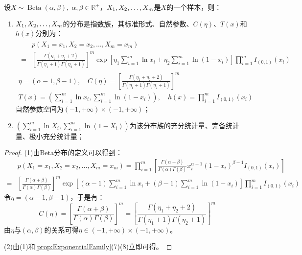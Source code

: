 \begin{theorem}
	设$X\sim\operatorname{Beta}(\alpha,\beta),\;\alpha,\beta\in\mathbb{R}^{+}$，$X_1, X_2, \dots, X_{m}$是$X$的一个样本，则：
	\begin{enumerate}
		\item $X_1, X_2, \dots, X_{m}$的分布是指数族，其标准形式、自然参数、$C(\eta)$、$T(x)$和$h(x)$分别为：
		\begin{gather*}
			\begin{aligned}
				&p(X_1=x_1,X_2=x_2,\dots,X_m=x_m) \\
				=&\left[\frac{\Gamma(\eta_1+\eta_2+2)}{\Gamma(\eta_1+1)\Gamma(\eta_2+1)}\right]^m\exp\left[\eta_1\sum_{i=1}^{m}\ln x_i+\eta_2\sum_{i=1}^{m}\ln(1-x_i)\right]\prod_{i=1}^{m}I_{(0,1)}(x_i)
			\end{aligned} \\
			\eta=(\alpha-1,\beta-1),\quad C(\eta)=\left[\frac{\Gamma(\eta_1+\eta_2+2)}{\Gamma(\eta_1+1)\Gamma(\eta_2+1)}\right]^m \\
			T(x)=\left(\sum_{i=1}^{m}\ln x_i,\sum_{i=1}^{m}\ln(1-x_i)\right),\quad h(x)=\prod_{i=1}^{m}I_{(0,1)}(x_i)
		\end{gather*}
		自然参数空间为$(-1,+\infty)\times(-1,+\infty)$；
		\item $\left(\sum\limits_{i=1}^{m}\ln X_i,\sum\limits_{i=1}^{m}\ln(1-X_i)\right)$为该分布族的充分统计量、完备统计量、极小充分统计量；
	\end{enumerate}
\end{theorem}
\begin{proof}
	(1)由Beta分布的定义可以得到：
	\begin{align*}
		&p(X_1=x_1,X_2=x_2,\dots,X_m=x_m)=\prod_{i=1}^{m}\left[\frac{\Gamma(\alpha+\beta)}{\Gamma(\alpha)\Gamma(\beta)}x_i^{\alpha-1}(1-x_i)^{\beta-1}I_{(0,1)}(x_i)\right] \\
		=&\left[\frac{\Gamma(\alpha+\beta)}{\Gamma(\alpha)\Gamma(\beta)}\right]^m\exp\left[(\alpha-1)\sum_{i=1}^{m}\ln x_i+(\beta-1)\sum_{i=1}^{m}\ln(1-x_i)\right]\prod_{i=1}^{m}I_{(0,1)}(x_i)
	\end{align*}
	令$\eta=(\alpha-1,\beta-1)$，于是有：
	\begin{equation*}
		C(\eta)=\left[\frac{\Gamma(\alpha+\beta)}{\Gamma(\alpha)\Gamma(\beta)}\right]^m=\left[\frac{\Gamma(\eta_1+\eta_2+2)}{\Gamma(\eta_1+1)\Gamma(\eta_2+1)}\right]^m
	\end{equation*}
	由$\eta$与$(\alpha,\beta)$的关系可得$\eta\in(-1,+\infty)\times(-1,+\infty)$。\par
	(2)由(1)和\cref{prop:ExponentialFamily}(7)(8)立即可得。
\end{proof}



